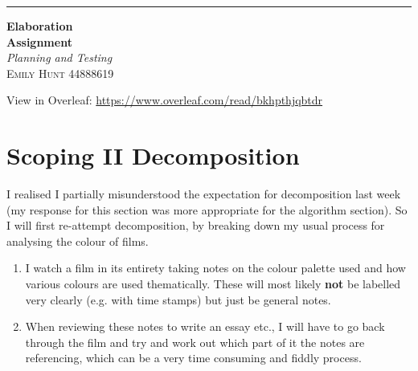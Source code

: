 \documentclass{article}
\begin{document}

\begin{titlepage} %
	
	\raggedleft %
	
	\rule{1pt}{\textheight} %
	\hspace{0.05\textwidth} %
	\parbox[b]{0.75\textwidth}{ %
		
		{\Huge\bfseries Elaboration \\[0.5\baselineskip] Assignment}\\[2\baselineskip] %
		{\large\textit{Planning and Testing}}\\[4\baselineskip] %
		{\Large\textsc{Emily Hunt 44888619}} %
		
		\vspace{0.5\textheight} %
		}

\end{titlepage}


View in Overleaf: \url{https://www.overleaf.com/read/bkhpthjqbtdr}

\tableofcontents

\pagebreak

\section{Scoping II Decomposition}
I realised I partially misunderstood the expectation for decomposition last week (my response for this section was more appropriate for the algorithm section). So I will first re-attempt decomposition, by breaking down my usual process for analysing the colour of films.

\begin{enumerate}
    \item I watch a film in its entirety taking notes on the colour palette used and how various colours are used thematically. These will most likely \textbf{not} be labelled very clearly (e.g. with time stamps) but just be general notes.
    \item When reviewing these notes to write an essay etc., I will have to go back through the film and try and work out which part of it the notes are referencing, which can be a very time consuming and fiddly process.
\end{enumerate} 
\end{document}

